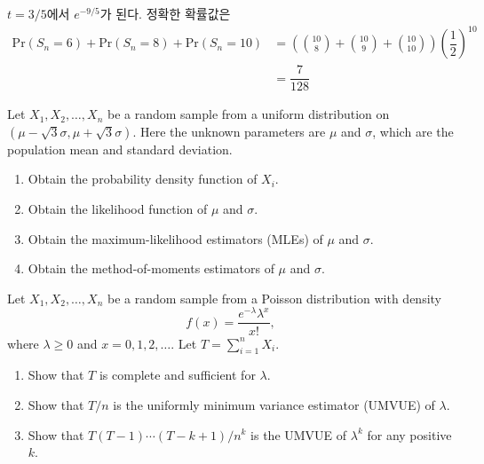 \documentclass[answers]{exam}
\begin{document}
\begin{questions}
\begin{solution}
\begin{enumerate}
      $t=3/5$에서 $e^{-9/5}$가 된다. 정확한 확률값은
      \begin{align}
        \mathrm{Pr}\left(S_{n}=6\right)+\mathrm{Pr}\left(S_{n}=8\right)+\mathrm{Pr}\left(S_{n}=10\right) &= \left({{10}\choose{8}}+{{10}\choose{9}}+{{10}\choose{10}}\right) \left(\dfrac{1}{2}\right)^{10}\\
        &= \dfrac{7}{128}
      \end{align}
    \end{enumerate}
   \end{solution}
   \question
   Let $X_{1},X_{2},\ldots, X_{n}$ be a random sample from a uniform distribution on $\left(\mu-\sqrt{3}\sigma,\mu+\sqrt{3}\sigma\right)$. Here the unknown parameters are $\mu$ and $\sigma$, which are the population mean and standard deviation.
   \begin{enumerate}
    \item Obtain the probability density function of $X_{i}$.
    \item Obtain the likelihood function of $\mu$ and $\sigma$.
    \item Obtain the maximum-likelihood estimators (MLEs) of $\mu$ and $\sigma$.
    \item Obtain the method-of-moments estimators of $\mu$ and $\sigma$.
   \end{enumerate}
   \begin{solution}

   \end{solution}
   \question
   Let $X_{1},X_{2},\ldots,X_{n}$ be a random sample from a Poisson distribution with density
   $$
    f\left(x\right)=\dfrac{e^{-\lambda}\lambda^{x}}{x!},
   $$
   where $\lambda \geq 0$ and $x=0,1,2,\ldots$. Let $T=\displaystyle \sum_{i=1}^{n}X_{i}$.
   \begin{enumerate}
    \item Show that $T$ is complete and sufficient for $\lambda$.
    \item Show that $T/n$ is the uniformly minimum variance estimator (UMVUE) of $\lambda$.
    \item Show that $T\left(T-1\right)\cdots \left(T-k+1\right)/n^{k}$ is the UMVUE of $\lambda^{k}$ for any positive $k$.
   \end{enumerate}
   \begin{solution}


\end{solution}
\end{questions}
\end{document}
